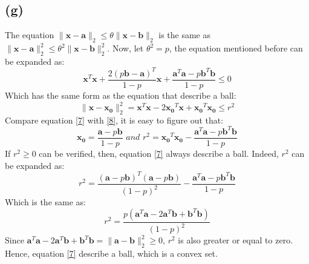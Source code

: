 \documentclass[10pt,a4paper]{article}
\begin{document}
\subsection*{(g)}
The equation $\| \mathbf{x} - \mathbf{a} \|_{2} \leq \theta \| \mathbf{x} - \mathbf{b} \|_{2}$ is the same as $\| \mathbf{x} - \mathbf{a} \|^{2}_{2} \leq \theta^{2} \| \mathbf{x} - \mathbf{b} \|^{2}_{2}$. Now, let $\theta^{2} = p$, the equation mentioned before can be expanded as:
\begin{equation}
	\mathbf{x}^{T}\mathbf{x} + \frac{2 (p \mathbf{b} - \mathbf{a})^{T}}{1 - p} \mathbf{x} + \frac{\mathbf{a}^{T} \mathbf{a} - p \mathbf{b}^{T}\mathbf{b}}{1 - p} \leq 0
	\label{7}
\end{equation}
Which has the same form as the equation that describe a ball:
\begin{equation}
	\| \mathbf{x} - \mathbf{x_{0}} \|^{2}_{2} = \mathbf{x}^{T} \mathbf{x} - 2 \mathbf{x_{0}}^{T} \mathbf{x} + \mathbf{x_{0}}^{T} \mathbf{x_{0}} \leq r^{2}
	\label{8}
\end{equation}
Compare equation \ref{7} with \ref{8}, it is easy to figure out that:
\begin{equation*}
	\mathbf{x_{0}} = \frac{\mathbf{a} - p \mathbf{b}}{1 - p} \textit{ and } r^{2} = \mathbf{x_{0}}^{T} \mathbf{x_{0}} - \frac{\mathbf{a}^{T} \mathbf{a} - p \mathbf{b}^{T} \mathbf{b}}{1 - p}
\end{equation*}
If $r^{2} \geq 0 $ can be verified, then, equation \ref{7} always describe a ball. Indeed, $r^{2}$ can be expanded as:
\begin{equation*}
	r^{2} = \frac{(\mathbf{a} - p \mathbf{b})^{T} (\mathbf{a} - p \mathbf{b})}{(1 - p)^{2}} - \frac{\mathbf{a}^{T} \mathbf{a} - p \mathbf{b}^{T} \mathbf{b}}{1 - p}
\end{equation*}
Which is the same as:
\begin{equation*}
	r^{2} = \frac{p(\mathbf{a}^{T} \mathbf{a} - 2 \mathbf{a}^{T} \mathbf{b} + \mathbf{b}^{T} \mathbf{b})}{(1 - p)^{2}}
\end{equation*}
Since $\mathbf{a}^{T} \mathbf{a} - 2 \mathbf{a}^{T}\mathbf{b} + \mathbf{b}^{T} \mathbf{b} = \| \mathbf{a} - \mathbf{b} \|^{2}_{2} \geq 0$, $r^{2}$ is also greater or equal to zero. Hence, equation \ref{7} describe a ball, which is a convex set.
\end{document}
